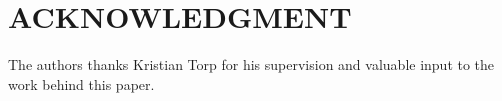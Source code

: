 \section*{ACKNOWLEDGMENT}

The authors thanks Kristian Torp for his supervision and valuable input to the work behind this paper.